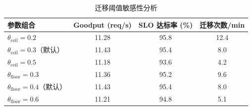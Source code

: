 \begin{table}[htbp]
\centering
\caption{迁移阈值敏感性分析}
\label{tab:threshold-sensitivity}
\small
\renewcommand{\arraystretch}{1.2}
\setlength{\tabcolsep}{6pt}
\begin{tabular}{lccc}
\toprule
参数组合 & Goodput (req/s) & SLO 达标率 (\%) & 迁移次数/min \\
\midrule
$\theta_{\mathrm{ceil}}=0.2$ & 11.28 & 95.8 & 12.4 \\
$\theta_{\mathrm{ceil}}=0.3$（默认） & 11.43 & 95.4 & 8.0 \\
$\theta_{\mathrm{ceil}}=0.5$ & 11.18 & 93.6 & 4.2 \\
\midrule
$\theta_{\mathrm{floor}}=0.3$ & 11.36 & 95.2 & 9.6 \\
$\theta_{\mathrm{floor}}=0.4$（默认） & 11.43 & 95.4 & 8.0 \\
$\theta_{\mathrm{floor}}=0.6$ & 11.21 & 94.8 & 5.1 \\
\bottomrule
\end{tabular}
\end{table}
